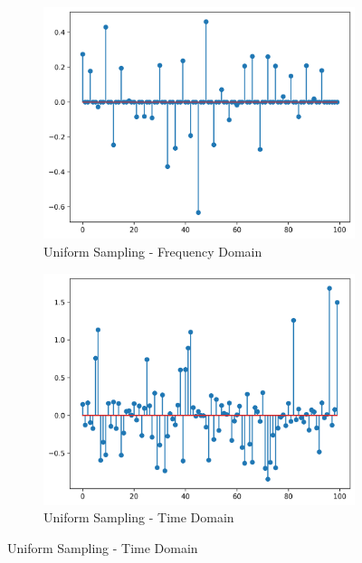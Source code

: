 \documentclass[11pt]{article}
\begin{document}
\begin{figure}[H]
    \centering
    \begin{subfigure}{.45\textwidth}
        \centering
        \includegraphics[width=\linewidth]{figs/q2b_uniformly_subsampled_signal_fft.png}
        \caption{Uniform Sampling - Frequency Domain}
        \label{fig:uniform_subsampled_signal_fft}
    \end{subfigure}%
    \begin{subfigure}{.45\textwidth}
        \centering
        \includegraphics[width=\linewidth]{figs/q2b_uniformly_subsampled_signal.png}
        \caption{Uniform Sampling - Time Domain}
        \label{fig:uniform_subsampled_signal}
    \end{subfigure}
    

\end{figure}
\end{document}
